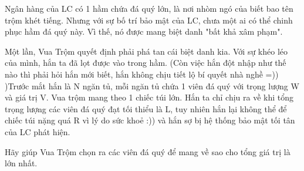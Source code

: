 Ngân hàng của LC có 1 hầm chứa đá quý lớn, là nơi nhòm ngó của biết bao tên trộm khét tiếng. Nhưng với sự bố trí bảo mật của LC, chưa một ai có thể chinh phục hầm đá quý này. Vì thế, nó được mang biệt danh "bất khả xâm phạm".  

   Một lần, Vua Trộm quyết định phải phá tan cái biệt danh kia. Với sự khéo léo của mình, hắn ta đã lọt được vào trong hầm. (Còn việc hắn đột nhập như thế nào thì phải hỏi hắn mới biết, hắn không chịu tiết lộ bí quyết nhà nghề =)) )Trước mắt hắn là N ngăn tủ, mỗi ngăn tủ chứa 1 viên đá quý với trọng lượng W và giá trị V. Vua trộm mang theo 1 chiếc túi lớn. Hắn ta chỉ chịu ra về khi tổng trọng lượng các viên đá quý đạt tối thiểu là L, tuy nhiên hắn lại không thể để chiếc túi nặng quá R vì lý do sức khoẻ :)) và hắn sợ bị hệ thống bảo mật tối tân của LC phát hiện.  

   Hãy giúp Vua Trộm chọn ra các viên đá quý để mang về sao cho tổng giá trị là lớn nhất.